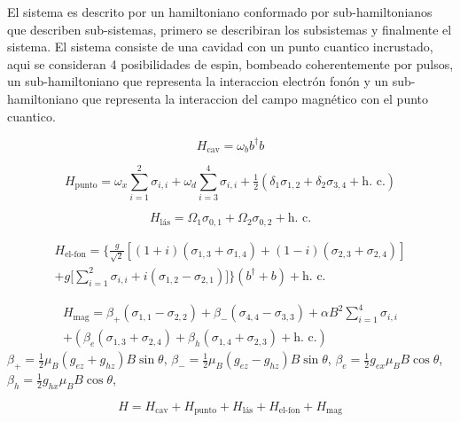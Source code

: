\documentclass[../main.tex]{subfiles}
\begin{document}
El sistema es descrito por un hamiltoniano conformado por sub-hamiltonianos que describen sub-sistemas, primero se describiran los subsistemas y finalmente el sistema. El sistema consiste de una cavidad con un punto cuantico incrustado, aqui se consideran 4 posibilidades de espin, bombeado coherentemente por pulsos, un sub-hamiltoniano que representa la interaccion electr\'on fon\'on y un sub-hamiltoniano que representa la interaccion del campo magn\'etico con el punto cuantico.

\begin{equation}
	H_\text{cav} = \omega_b b^\dagger b
\end{equation}

\begin{equation}
	H_\text{punto} = \omega_x \sum_{i = 1}^{2} \sigma_{i,i} + \omega_d \sum_{i = 3}^{4} \sigma_{i,i} + \tfrac{1}{2} (\delta_1 \sigma_{1, 2} + \delta_2 \sigma_{3, 4} + \text{h. c.})
\end{equation}

\begin{equation}
	H_\text{l\'as} = \Omega_1 \sigma_{0, 1} + \Omega_2 \sigma_{0, 2} + \text{h. c.}
\end{equation}

\begin{multline}
	H_\text{el-fon} = \Big\{\frac{g}{\sqrt{2}} [(1 + i)(\sigma_{1, 3} + \sigma_{1, 4}) + (1 - i)(\sigma_{2, 3} + \sigma_{2, 4})]\\ + g \big[\sum_{i = 1}^{2} \sigma_{i, i} + i (\sigma_{1, 2} - \sigma_{2, 1})\big] \Big\}(b^\dagger + b) + \text{h. c.}
\end{multline}

\begin{multline}
	H_\text{mag} = \beta_+ (\sigma_{1, 1} - \sigma_{2, 2}) + \beta_- (\sigma_{4, 4} - \sigma_{3, 3}) + \alpha B^2 \sum_{i = 1}^{4} \sigma_{i, i}\\ + (\beta_e (\sigma_{1, 3} + \sigma_{2, 4}) + \beta_h (\sigma_{1, 4} + \sigma_{2, 3}) + \text{h. c.})
\end{multline}
$\beta_+ = \tfrac{1}{2} \mu_B (g_{ez} + g_{hz}) B \sin\theta$, $\beta_- = \tfrac{1}{2} \mu_B (g_{ez}-g_{hz}) B \sin\theta$, $\beta_e = \tfrac{1}{2} g_{ex} \mu_B B \cos\theta$,  $\beta_h = \tfrac{1}{2} g_{hx} \mu_B B \cos\theta$, 

\begin{equation}
	H = H_\text{cav} + H_\text{punto} + H_\text{l\'as} + H_\text{el-fon} + H_\text{mag}
\end{equation}
\end{document}
